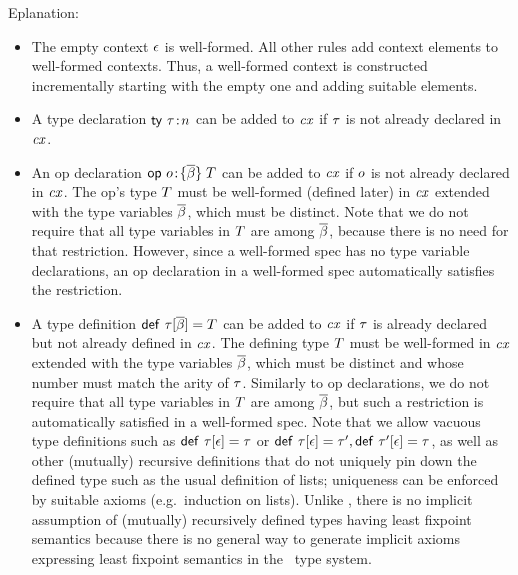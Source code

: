 Eplanation:
\begin{itemize}
\item
The empty context $\epsilon$ is well-formed. All other rules add context elements
to well-formed contexts. Thus, a well-formed context is constructed
incrementally starting with the empty one and adding suitable elements.
\item
A type declaration $\mathsf{ty}\ \tau\!:\!n$ can be added to $\mathit{cx}$ if $\tau$ is not already
declared in $\mathit{cx}$.
\item
An op declaration $\mathsf{op}\ o\!:\!\{\overline{\beta}\}\;T$ can be added to $\mathit{cx}$ if $o$ is not already
declared in $\mathit{cx}$. The op's type $T$ must be well-formed (defined later) in
$\mathit{cx}$ extended with the type variables $\overline{\beta}$, which must be distinct. Note
that we do not require that all type variables in $T$ are among $\overline{\beta}$,
because there is no need for that restriction. However, since a well-formed
spec has no type variable declarations, an op declaration in a well-formed
spec automatically satisfies the restriction.
\item
A type definition $\mathsf{def}\ \tau[\overline{\beta}]=T$ can be added to $\mathit{cx}$ if $\tau$ is already
declared but not already defined in $\mathit{cx}$. The defining type $T$ must be
well-formed in $\mathit{cx}$ extended with the type variables $\overline{\beta}$, which must be
distinct and whose number must match the arity of $\tau$. Similarly to op
declarations, we do not require that all type variables in $T$ are among
$\overline{\beta}$, but such a restriction is automatically satisfied in a well-formed
spec. Note that we allow vacuous type definitions such as
$\mathsf{def}\ \tau[\epsilon]=\tau$ or
$\mathsf{def}\ \tau[\epsilon]=\tau',\mathsf{def}\ \tau'[\epsilon]=\tau$, as well as
other (mutually) recursive definitions that do not uniquely pin down the
defined type such as the usual definition of lists; uniqueness can be enforced
by suitable axioms (e.g.\ induction on lists). Unlike \cite{lm}, there is no
implicit assumption of (mutually) recursively defined types having least
fixpoint semantics because there is no general way to generate implicit axioms
expressing least fixpoint semantics in the \MS\ type system.

\end{itemize}
